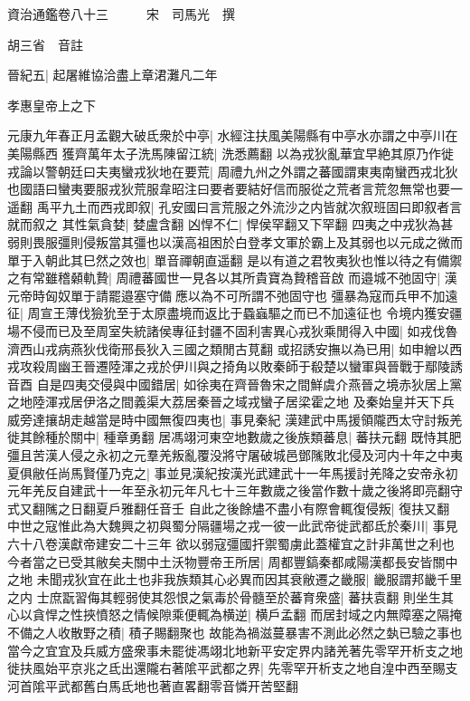 資治通鑑卷八十三　　　宋　司馬光　撰

胡三省　音註

晉紀五|{
	起屠維協洽盡上章涒灘凡二年}


孝惠皇帝上之下

元康九年春正月孟觀大破氐衆於中亭|{
	水經注扶風美陽縣有中亭水亦謂之中亭川在美陽縣西}
獲齊萬年太子洗馬陳留江統|{
	洗悉薦翻}
以為戎狄亂華宜早絶其原乃作徙戎論以警朝廷曰夫夷蠻戎狄地在要荒|{
	周禮九州之外謂之蕃國謂東夷南蠻西戎北狄也國語曰蠻夷要服戎狄荒服韋昭注曰要者要結好信而服從之荒者言荒忽無常也要一遥翻}
禹平九土而西戎即叙|{
	孔安國曰言荒服之外流沙之内皆就次叙班固曰即叙者言就而叙之}
其性氣貪婪|{
	婪盧含翻}
凶悍不仁|{
	悍侯罕翻又下罕翻}
四夷之中戎狄為甚弱則畏服彊則侵叛當其彊也以漢高祖困於白登孝文軍於霸上及其弱也以元成之微而單于入朝此其巳然之效也|{
	單音禪朝直遥翻}
是以有道之君牧夷狄也惟以待之有備禦之有常雖稽顙軌贄|{
	周禮蕃國世一見各以其所貴寶為贄稽音啟}
而邉城不弛固守|{
	漢元帝時匈奴單于請罷邉塞守備應以為不可所謂不弛固守也}
彊暴為寇而兵甲不加遠征|{
	周宣王薄伐獫狁至于太原盡境而返比于蟁蝱驅之而已不加遠征也}
令境内獲安疆場不侵而已及至周室失統諸侯專征封疆不固利害異心戎狄乘閒得入中國|{
	如戎伐魯濟西山戎病燕狄伐衛邢長狄入三國之類閒古莧翻}
或招誘安撫以為已用|{
	如申繒以西戎攻殺周幽王晉遷陸渾之戎於伊川與之掎角以敗秦師于殽楚以蠻軍與晉戰于鄢陵誘音酉}
自是四夷交侵與中國錯居|{
	如徐夷在齊晉魯宋之間鮮虞介燕晉之境赤狄居上黨之地陸渾戎居伊洛之間義渠大荔居秦晉之域戎蠻子居梁霍之地}
及秦始皇并天下兵威旁達攘胡走越當是時中國無復四夷也|{
	事見秦紀}
漢建武中馬援領隴西太守討叛羌徙其餘種於關中|{
	種章勇翻}
居馮翊河東空地數歲之後族類蕃息|{
	蕃扶元翻}
既恃其肥彊且苦漢人侵之永初之元羣羌叛亂覆没將守屠破城邑鄧隲敗北侵及河内十年之中夷夏俱敝任尚馬賢僅乃克之|{
	事並見漢紀按漢光武建武十一年馬援討羌降之安帝永初元年羌反自建武十一年至永初元年凡七十三年數歲之後當作數十歲之後將即亮翻守式又翻隲之日翻夏戶雅翻任音壬}
自此之後餘燼不盡小有際會輒復侵叛|{
	復扶又翻}
中世之寇惟此為大魏興之初與蜀分隔疆場之戎一彼一此武帝徙武都氐於秦川|{
	事見六十八卷漢獻帝建安二十三年}
欲以弱寇彊國扞禦蜀虜此蓋權宜之計非萬世之利也今者當之已受其敝矣夫關中土沃物豐帝王所居|{
	周都豐鎬秦都咸陽漢都長安皆關中之地}
未聞戎狄宜在此土也非我族類其心必異而因其衰敝遷之畿服|{
	畿服謂邦畿千里之内}
士庶翫習侮其輕弱使其怨恨之氣毒於骨髓至於蕃育衆盛|{
	蕃扶袁翻}
則坐生其心以貪悍之性挾憤怒之情候隙乘便輒為横逆|{
	横戶孟翻}
而居封域之内無障塞之隔掩不備之人收散野之積|{
	積子賜翻聚也}
故能為禍滋蔓暴害不測此必然之埶已驗之事也當今之宜宜及兵威方盛衆事未罷徙馮翊北地新平安定界内諸羌著先零罕开析支之地徙扶風始平京兆之氐出還隴右著隂平武都之界|{
	先零罕开析支之地自湟中西至賜支河首隂平武都舊白馬氐地也著直畧翻零音憐开苦堅翻}
